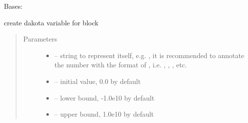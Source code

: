 \documentclass[letterpaper,10pt,english]{sphinxmanual}
\begin{document}

\begin{fulllineitems}
\label{\detokenize{src/apidocs/dakutils:genopt.dakutils.DakotaParam}}
Bases: \href{https://docs.python.org/2/library/functions.html\#object}{}

create dakota variable for  block
\begin{quote}\begin{description}
\item[{Parameters}] \leavevmode\begin{itemize}
\item {} 
 -- string to represent itself, e.g. ,
it is recommended to annotate the number with the format of ,
i.e. , , , etc.

\item {} 
 -- initial value, 0.0 by default

\item {} 
 -- lower bound, -1.0e10 by default

\item {} 
 -- upper bound, 1.0e10 by default

\end{itemize}

\end{description}\end{quote}

\begin{fulllineitems}
\label{\detokenize{src/apidocs/dakutils:genopt.dakutils.DakotaParam.initial}}
\end{fulllineitems}


\begin{fulllineitems}
\label{\detokenize{src/apidocs/dakutils:genopt.dakutils.DakotaParam.label}}
\end{fulllineitems}


\end{fulllineitems}
\end{document}
